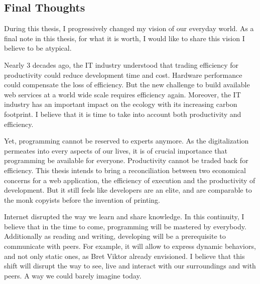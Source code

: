 

\subsection{Final Thoughts}

During this thesis, I progressively changed my vision of our everyday world.
As a final note in this thesis, for what it is worth, I would like to share this vision I believe to be atypical.


Nearly 3 decades ago, the IT industry understood that trading efficiency for productivity could reduce development time and cost.
Hardware performance could compensate the loss of efficiency.
But the new challenge to build available web services at a world wide scale requires efficiency again.
Moreover, the IT industry has an important impact on the ecology with its increasing carbon footprint.
I believe that it is time to take into account both productivity and efficiency.

Yet, programming cannot be reserved to experts anymore.
As the digitalization permeates into every aspects of our lives, it is of crucial importance that programming be available for everyone.
Productivity cannot be traded back for efficiency.
This thesis intends to bring a reconciliation between two economical concerns for a web application, the efficiency of execution and the productivity of development.
But it still feels like developers are an elite, and are comparable to the monk copyists before the invention of printing.

Internet disrupted the way we learn and share knowledge.
In this continuity, I believe that in the time to come, programming will be mastered by everybody.
Additionally as reading and writing, developing will be a prerequisite to communicate with peers.
For example, it will allow to express dynamic behaviors, and not only static ones, as Bret Viktor already envisioned.
I believe that this shift will disrupt the way to see, live and interact with our surroundings and with peers.
A way we could barely imagine today.


